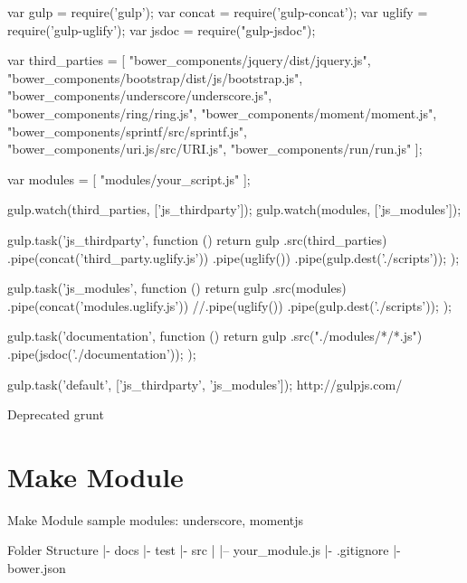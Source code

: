 var gulp = require('gulp');
var concat = require('gulp-concat');
var uglify = require('gulp-uglify');
var jsdoc = require("gulp-jsdoc");

var third_parties = [
  "bower_components/jquery/dist/jquery.js",
  "bower_components/bootstrap/dist/js/bootstrap.js",
  "bower_components/underscore/underscore.js",
  "bower_components/ring/ring.js",
  "bower_components/moment/moment.js",
  "bower_components/sprintf/src/sprintf.js",
  "bower_components/uri.js/src/URI.js",
  "bower_components/run/run.js"
];

var modules = [
  "modules/your_script.js"
];

gulp.watch(third_parties, ['js_thirdparty']);
gulp.watch(modules, ['js_modules']);

gulp.task('js_thirdparty', function () {
  return gulp
    .src(third_parties)
    .pipe(concat('third_party.uglify.js'))
    .pipe(uglify())
    .pipe(gulp.dest('./scripts'));
});

gulp.task('js_modules', function () {
  return gulp
    .src(modules)
    .pipe(concat('modules.uglify.js'))
    //.pipe(uglify())
    .pipe(gulp.dest('./scripts'));
});

gulp.task('documentation', function () {
  return gulp
    .src("./modules/*/*.js")
    .pipe(jsdoc('./documentation'));
});

gulp.task('default', ['js_thirdparty', 'js_modules']);
http://gulpjs.com/

Deprecated
grunt

\section{Make Module}

Make Module
sample modules: underscore, momentjs

Folder Structure
|- docs
|- test
|- src
|   |-- your_module.js
|- .gitignore
|- bower.json



